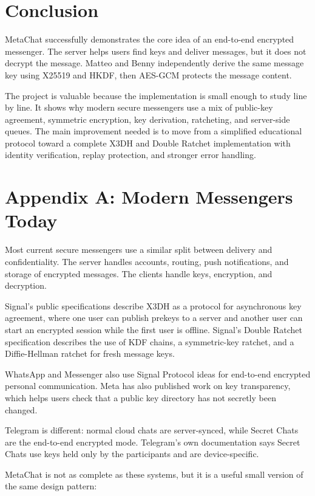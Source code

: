 \documentclass[12pt,a4paper]{article}
\begin{document}
\section{Conclusion}

MetaChat successfully demonstrates the core idea of an end-to-end encrypted messenger. The server helps users find keys and deliver messages, but it does not decrypt the message. Matteo and Benny independently derive the same message key using X25519 and HKDF, then AES-GCM protects the message content.

The project is valuable because the implementation is small enough to study line by line. It shows why modern secure messengers use a mix of public-key agreement, symmetric encryption, key derivation, ratcheting, and server-side queues. The main improvement needed is to move from a simplified educational protocol toward a complete X3DH and Double Ratchet implementation with identity verification, replay protection, and stronger error handling.

\appendix

\section{Appendix A: Modern Messengers Today}

Most current secure messengers use a similar split between delivery and confidentiality. The server handles accounts, routing, push notifications, and storage of encrypted messages. The clients handle keys, encryption, and decryption.

Signal's public specifications describe X3DH as a protocol for asynchronous key agreement, where one user can publish prekeys to a server and another user can start an encrypted session while the first user is offline. Signal's Double Ratchet specification describes the use of KDF chains, a symmetric-key ratchet, and a Diffie-Hellman ratchet for fresh message keys.

WhatsApp and Messenger also use Signal Protocol ideas for end-to-end encrypted personal communication. Meta has also published work on key transparency, which helps users check that a public key directory has not secretly been changed.

Telegram is different: normal cloud chats are server-synced, while Secret Chats are the end-to-end encrypted mode. Telegram's own documentation says Secret Chats use keys held only by the participants and are device-specific.

MetaChat is not as complete as these systems, but it is a useful small version of the same design pattern:
\end{document}
